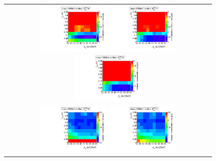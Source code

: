 \begin{figure}[!h]
  \centering 
  \begin{tabular}{c}
    \includegraphics[width=0.33\textwidth]{figures/analysis/Optimisation/Madgraph_signal_mass_100_ctau_5cm_ECaloLe5_SOverDeltaBStatPlusSys_0.pdf} 
    \includegraphics[width=0.33\textwidth]{figures/analysis/Optimisation/Madgraph_signal_mass_100_ctau_5cm_ECaloLe5_SOverDeltaBStatPlusSys_1.pdf} 
    \includegraphics[width=0.33\textwidth]{figures/analysis/Optimisation/Madgraph_signal_mass_100_ctau_5cm_ECaloLe5_SOverDeltaBStatPlusSys_2.pdf} \\
    \includegraphics[width=0.33\textwidth]{figures/analysis/Optimisation/Madgraph_signal_mass_500_ctau_5cm_ECaloLe5_SOverDeltaBStatPlusSys_0.pdf} 
    \includegraphics[width=0.33\textwidth]{figures/analysis/Optimisation/Madgraph_signal_mass_500_ctau_5cm_ECaloLe5_SOverDeltaBStatPlusSys_1.pdf}

\end{tabular}
\end{figure}
